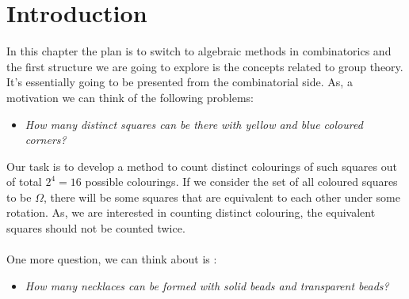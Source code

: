 \section{Introduction}
In this chapter the plan is to switch to algebraic methods in combinatorics and the first structure we are going to explore is the concepts related to group theory. It's essentially going to be presented from the combinatorial side. As, a motivation we can think of the following problems:
\begin{itemize}
\item \emph{How many distinct squares can be there with yellow and blue coloured corners?}
\end{itemize}
Our task is to develop a method to count distinct colourings of such squares out of total $2^4=16$ possible colourings. If we consider the set of all coloured squares to be $\Omega$, there will be some squares that are equivalent to each other under some rotation. As, we are interested in counting distinct colouring, the equivalent squares should not be counted twice.
\paragraph{}
One more question, we can think about is :
\begin{itemize}
\item \emph{How many necklaces can be formed with solid beads and transparent beads? }
\end{itemize}
